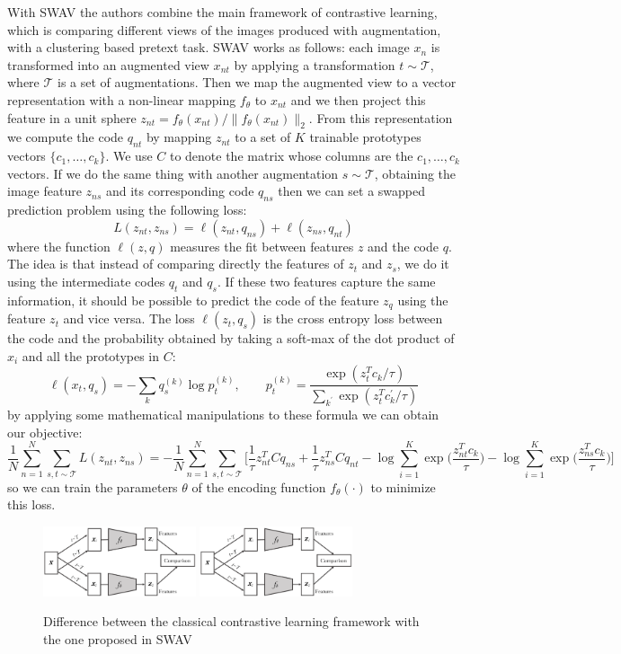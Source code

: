 With SWAV the authors combine the main framework of contrastive learning, which is comparing different views of the images produced with augmentation, with a clustering based pretext task. SWAV works as follows: each image $x_n$ is transformed into an augmented view $x_{nt}$ by applying a transformation $t \sim \mathcal{T}$, where $\mathcal{T}$ is a set of augmentations. Then we map the augmented view to a vector representation with a non-linear mapping $f_\theta$ to $x_{nt}$ and we then project this feature in a unit sphere $z_{nt} = f_\theta(x_{nt})/\lVert f_\theta(x_{nt}) \rVert_2$. From this representation we compute the code $q_{nt}$ by mapping $z_{nt}$ to a set of $K$ trainable prototypes vectors $\{c_1, \dots, c_k\}$. We use $C$ to denote the matrix whose columns are the $c_1, \dots, c_k$ vectors. If we do the same thing with another augmentation $s \sim \mathcal{T}$, obtaining the image feature $z_{ns}$ and its corresponding code $q_{ns}$ then we can set a swapped prediction problem using the following loss:
\[ L(z_{nt}, z_{ns}) = \ell(z_{nt}, q_{ns}) + \ell(z_{ns}, q_{nt}) \]
where the function $\ell(z, q)$ measures the fit between features $z$ and the code $q$. The idea is that instead of comparing directly the features of $z_t$ and $z_s$, we do it using the intermediate codes $q_t$ and $q_s$. If these two features capture the same information, it should be possible to predict the code of the feature $z_q$ using the feature $z_t$ and vice versa. The loss $\ell(z_t, q_s)$ is the cross entropy loss between the code and the probability obtained by taking a soft-max of the dot product of $x_i$ and all the prototypes in $C$:
\[\ell(x_t, q_s) = -\sum_k q_s^{(k)}\log p_t^{(k)}, \qquad p_t^{(k)} = \frac{\exp(z_t^Tc_k/\tau)}{\sum_{k^\prime}\exp(z_t^Tc_k^\prime/\tau)}\]
by applying some mathematical manipulations to these formula we can obtain our objective: 
\[\frac{1}{N}\sum_{n=1}^N \sum_{s, t \sim \mathcal{T}}L(z_{nt}, z_{ns}) = -\frac{1}{N}\sum_{n=1}^N \sum_{s, t \sim \mathcal{T}} \Bigg[ \frac{1}{\tau}z_{nt}^TCq_{ns} + \frac{1}{\tau}z_{ns}^TCq_{nt} - \log\sum_{i=1}^K\exp\Big(\frac{z_{nt}^Tc_k}{\tau}\Big) - \log\sum_{i=1}^K\exp\Big(\frac{z_{ns}^Tc_k}{\tau}\Big) \Bigg] \]
so we can train the parameters $\theta$ of the encoding function $f_\theta(\cdot)$ to minimize this loss.
\begin{figure}[H]
	\centering
	{\includegraphics[width=0.4\textwidth]{./images/swav_contrastive.png}}
	\qquad
	{\includegraphics[width=0.4\textwidth]{./images/swav_contrastive.png}}
	\caption{Difference between the classical contrastive learning framework with the one proposed in SWAV}

\end{figure}
